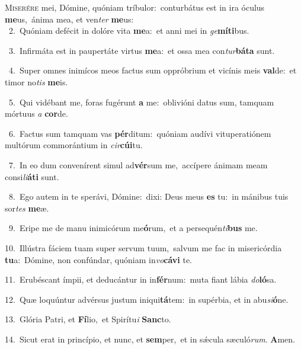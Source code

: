 \lettrine{\initial\textcolor{\initialcolor}{M}}{iserére} mei, Dómine, quóniam tríbulor:~\dagger conturbátus est in ira óculus \textbf{me}\-us,~\star ánima mea, et ven\textit{ter} \textbf{me}\-us:\\
{\numbfont\textcolor{\numbcolor}{~2.}}~Quóniam defécit in dolóre vita \textbf{me}\-a:~\star et anni mei in \textit{ge}\-\textbf{mí}\textbf{ti}bus.\par
{\numbfont\textcolor{\numbcolor}{~3.}}~Infirmáta est in paupertáte virtus \textbf{me}\-a:~\star et ossa mea con\-\textit{tur}\-\textbf{bá}\textbf{ta} sunt.\par
{\numbfont\textcolor{\numbcolor}{~4.}}~Super omnes inimícos meos factus sum oppróbrium et vicínis meis \textbf{val}\-de:~\star et timor no\textit{tis} \textbf{me}\-is.\par
{\numbfont\textcolor{\numbcolor}{~5.}}~Qui vidébant me, foras fugérunt \textbf{a} me:~\star oblivióni datus sum, tamquam mórtuus \textit{a} \textbf{cor}\-de.\par
{\numbfont\textcolor{\numbcolor}{~6.}}~Factus sum tamquam vas \textbf{pér}\-ditum:~\star quóniam audívi vituperatiónem multórum commorántium in \textit{cir}\-\textbf{cú}\textbf{i}tu.\par
{\numbfont\textcolor{\numbcolor}{~7.}}~In eo dum convenírent simul ad\-\textbf{vér}\-sum me,~\star accípere ánimam meam consi\-\textit{li}\-\textbf{á}\textbf{ti} sunt.\par
{\numbfont\textcolor{\numbcolor}{~8.}}~Ego autem in te sperávi, Dómine:~\dagger dixi: Deus meus \textbf{es} tu:~\star in mánibus tuis sor\textit{tes} \textbf{me}\-æ.\par
{\numbfont\textcolor{\numbcolor}{~9.}}~Eripe me de manu inimicórum me\-\textbf{ó}\-rum,~\star et a persequén\-\textit{ti}\-\textbf{bus} me.\par
{\numbfont\textcolor{\numbcolor}{10.}}~Illústra fáciem tuam super servum tuum,~\dagger salvum me fac in misericórdia \textbf{tu}\-a:~\star Dómine, non confúndar, quóniam in\-\textit{vo}\-\textbf{cá}\textbf{vi} te.\par
{\numbfont\textcolor{\numbcolor}{11.}}~Erubéscant ímpii, et deducántur in in\-\textbf{fér}\-num:~\star muta fiant lábia \textit{do}\-\textbf{ló}sa.\par
{\numbfont\textcolor{\numbcolor}{12.}}~Quæ loquúntur advérsus justum iniqui\-\textbf{tá}\-tem:~\star in supérbia, et in abu\-\textit{si}\-\textbf{ó}ne.\par
{\numbfont\textcolor{\numbcolor}{13.}}~Glória Patri, et \textbf{Fí}\-lio,~\star et Spirítu\textit{i} \textbf{Sanc}\-to.\par
{\numbfont\textcolor{\numbcolor}{14.}}~Sicut erat in princípio, et nunc, et \textbf{sem}\-per,~\star et in sǽcula sæculó\-\textit{rum}\-. \textbf{A}\-men.\par
